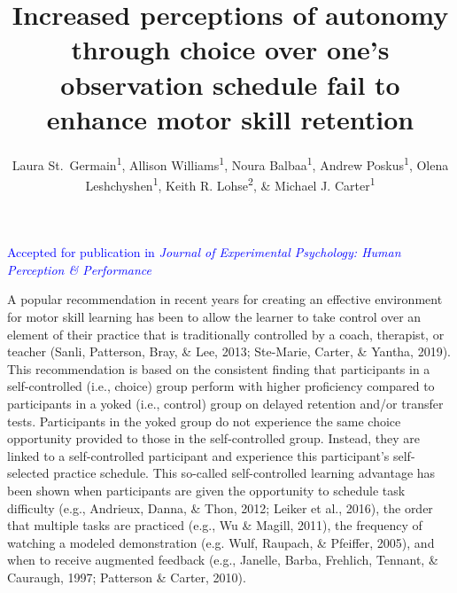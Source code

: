 \documentclass[
  english,
  doc, donotrepeattitle,floatsintext]{apa7}
\title{Increased perceptions of autonomy through choice over one's observation schedule fail to enhance motor skill retention}
\author{Laura St.~Germain\textsuperscript{1}, Allison Williams\textsuperscript{1}, Noura Balbaa\textsuperscript{1}, Andrew Poskus\textsuperscript{1}, Olena Leshchyshen\textsuperscript{1}, Keith R. Lohse\textsuperscript{2}, \& Michael J. Carter\textsuperscript{1}}
\date{}
\affiliation{\vspace{0.5cm}\textsuperscript{1} Department of Kinesiology, McMaster University\\\textsuperscript{2} Program in Physical Therapy, Washington University School of Medicine in Saint Louis}
\begin{document}
\maketitle

\vspace{-0.5em}

\noindent

\begin{center}
\textcolor{blue}{Accepted for publication in \emph{Journal of Experimental Psychology: Human Perception \& Performance}}
\end{center}

\vspace{0.5em}

A popular recommendation in recent years for creating an effective environment for motor skill learning has been to allow the learner to take control over an element of their practice that is traditionally controlled by a coach, therapist, or teacher (Sanli, Patterson, Bray, \& Lee, 2013; Ste-Marie, Carter, \& Yantha, 2019). This recommendation is based on the consistent finding that participants in a self-controlled (i.e., choice) group perform with higher proficiency compared to participants in a yoked (i.e., control) group on delayed retention and/or transfer tests. Participants in the yoked group do not experience the same choice opportunity provided to those in the self-controlled group. Instead, they are linked to a self-controlled participant and experience this participant's self-selected practice schedule. This so-called self-controlled learning advantage has been shown when participants are given the opportunity to schedule task difficulty (e.g., Andrieux, Danna, \& Thon, 2012; Leiker et al., 2016), the order that multiple tasks are practiced (e.g., Wu \& Magill, 2011), the frequency of watching a modeled demonstration (e.g. Wulf, Raupach, \& Pfeiffer, 2005), and when to receive augmented feedback (e.g., Janelle, Barba, Frehlich, Tennant, \& Cauraugh, 1997; Patterson \& Carter, 2010).
\end{document}
